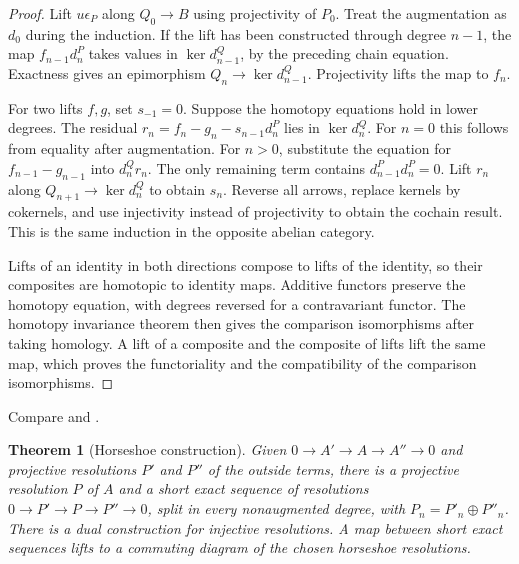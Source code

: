 \documentclass[11pt,oneside,openany]{book}
\newtheorem{theorem}{Theorem}[chapter]
\theoremstyle{definition}
\theoremstyle{remark}
\begin{document}
\begin{proof}
Lift \(u\epsilon_P\) along \(Q_0\to B\) using projectivity of
\(P_0\). Treat the augmentation as \(d_0\) during the induction.
If the lift has been constructed through degree \(n-1\), the map
\(f_{n-1}d_n^P\) takes values in \(\ker d_{n-1}^Q\), by the
preceding chain equation. Exactness gives an epimorphism
\(Q_n\to\ker d_{n-1}^Q\). Projectivity lifts the map to \(f_n\).

For two lifts \(f,g\), set \(s_{-1}=0\). Suppose the homotopy
equations hold in lower degrees. The residual
\(r_n=f_n-g_n-s_{n-1}d_n^P\) lies in \(\ker d_n^Q\).
For \(n=0\) this follows from equality after augmentation.
For \(n>0\), substitute the equation for \(f_{n-1}-g_{n-1}\)
into \(d_n^Q r_n\). The only remaining term contains
\(d_{n-1}^P d_n^P=0\). Lift \(r_n\) along
\(Q_{n+1}\to\ker d_n^Q\) to obtain \(s_n\).
Reverse all arrows, replace kernels by cokernels, and use
injectivity instead of projectivity to obtain the cochain result.
This is the same induction in the opposite abelian category.

Lifts of an identity in both directions compose to lifts of the
identity, so their composites are homotopic to identity maps.
Additive functors preserve the homotopy equation, with degrees
reversed for a contravariant functor. The homotopy invariance
theorem then gives the comparison isomorphisms after taking
homology. A lift of a composite and the composite of lifts lift
the same map, which proves the functoriality and the compatibility
of the comparison isomorphisms.
\end{proof}

Compare \cite[Comparison Theorems 2.2.6 and 2.3.7]{weibel} and
\cite[Theorem 6.16]{rotman}.

\begin{theorem}[Horseshoe construction]
\label{p103:ALG-10-C02-S01}
Given \(0\to A'\to A\to A''\to0\) and projective resolutions
\(P'\) and \(P''\) of the outside terms, there is a projective
resolution \(P\) of \(A\) and a short exact sequence of resolutions
\(0\to P'\to P\to P''\to0\), split in every nonaugmented degree,
with \(P_n=P'_n\oplus P''_n\). There is a dual construction for
injective resolutions. A map between short exact sequences lifts
to a commuting diagram of the chosen horseshoe resolutions.
\end{theorem}
\end{document}
